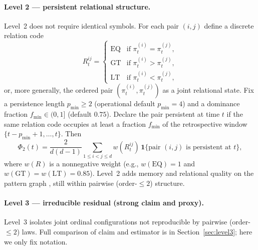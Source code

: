 \documentclass[11pt,a4paper]{article}
\begin{document}
\paragraph{Level 2 --- persistent relational structure.}
Level~2 does not require identical symbols. For each pair $(i,j)$ define
a discrete relation code
\begin{equation}
R_t^{ij}
=
\begin{cases}
\mathrm{EQ} & \text{if }\pi^{(i)}_t=\pi^{(j)}_t,\\
\mathrm{GT} & \text{if }\pi^{(i)}_t>\pi^{(j)}_t,\\
\mathrm{LT} & \text{if }\pi^{(i)}_t<\pi^{(j)}_t,
\end{cases}
\end{equation}
or, more generally, the ordered pair $(\pi^{(i)}_t,\pi^{(j)}_t)$ as a
joint relational state. Fix a persistence length $p_{\min}\geq 2$
(operational default $p_{\min}=4$) and a dominance fraction
$f_{\min}\in(0,1]$ (default $0.75$). Declare the pair persistent at time
$t$ if the same relation code occupies at least a fraction $f_{\min}$ of
the retrospective window $\{t-p_{\min}+1,\ldots,t\}$. Then
\begin{equation}
\label{eq:phi2}
\Phi_2(t)
=\frac{2}{d(d-1)}
\sum_{1\leq i<j\leq d}
w(R_t^{ij})\,
\mathbf{1}\bigl\{\text{pair $(i,j)$ is persistent at $t$}\bigr\},
\end{equation}
where $w(R)$ is a nonnegative weight (e.g., $w(\mathrm{EQ})=1$ and
$w(\mathrm{GT})=w(\mathrm{LT})=0.85$). Level~2 adds memory and
relational quality on the pattern graph
\cite{McCullough2015,Padilla2026nested}, still within pairwise
(order-$\le 2$) structure.

\paragraph{Level 3 --- irreducible residual (strong claim and proxy).}
Level~3 isolates joint ordinal configurations not reproducible by
pairwise (order-$\le 2$) laws. Full comparison of claim and estimator is
in Section~\ref{sec:level3}; here we only fix notation.
\end{document}
